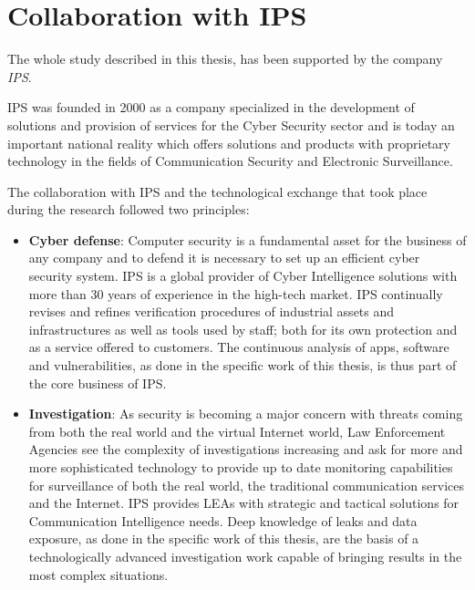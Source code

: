 	\section{Collaboration with IPS}
		\par The whole study described in this thesis, has been supported by the company \textit{IPS}\cite{ips}.\newline
		\par IPS was founded in 2000 as a company specialized in the development of solutions and provision of services for the Cyber Security sector and is today an important national reality which offers solutions and products with proprietary technology in the fields of Communication Security and Electronic Surveillance. \newline
		\par The collaboration with IPS and the technological exchange that took place during the research followed two principles:
		\begin{itemize}
			\item \textbf{Cyber defense}: Computer security is a fundamental asset for the business of any company and to defend it is necessary to set up an efficient cyber security system. IPS is a global provider of Cyber Intelligence solutions with more than 30 years of experience in the high-tech market.\newline
			IPS continually revises and refines verification procedures of industrial assets and infrastructures as well as tools used by staff; both for its own protection and as a service offered to customers.\newline
			The continuous analysis of apps, software and vulnerabilities, as done in the specific work of this thesis, is thus part of the core business of IPS.\newline
			\item \textbf{Investigation}: As security is becoming a major concern with threats coming from both the real world and the virtual Internet world, Law Enforcement Agencies see the complexity of investigations increasing and ask for more and more sophisticated technology to provide up to date monitoring capabilities for surveillance of both the real world, the traditional communication services and the Internet. IPS provides LEAs with strategic and tactical solutions for Communication Intelligence needs. Deep knowledge of leaks and data exposure, as done in the specific work of this thesis, are the basis of a technologically advanced investigation work capable of bringing results in the most complex situations.
		\end{itemize}

